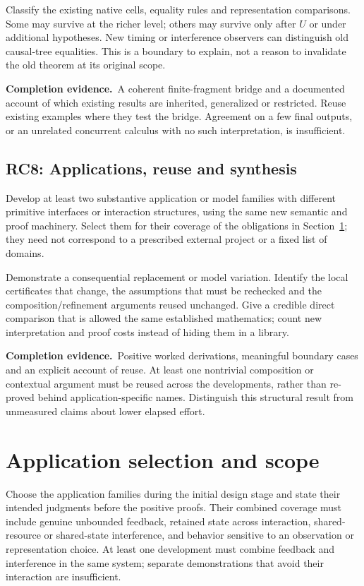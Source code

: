 \documentclass[11pt,a4paper]{article}
\newcommand{\deliver}{\par\textbf{Completion evidence.}\ }
\begin{document}
Classify the existing native cells, equality rules and representation comparisons. Some may survive at the richer level; others may survive only after \(U\) or under additional hypotheses. New timing or interference observers can distinguish old causal-tree equalities. This is a boundary to explain, not a reason to invalidate the old theorem at its original scope.

\deliver A coherent finite-fragment bridge and a documented account of which existing results are inherited, generalized or restricted. Reuse existing examples where they test the bridge. Agreement on a few final outputs, or an unrelated concurrent calculus with no such interpretation, is insufficient.

\subsection*{RC8: Applications, reuse and synthesis}\label{rc8}
Develop at least two substantive application or model families with different primitive interfaces or interaction structures, using the same new semantic and proof machinery. Select them for their coverage of the obligations in Section~\ref{sec:applications}; they need not correspond to a prescribed external project or a fixed list of domains.

Demonstrate a consequential replacement or model variation. Identify the local certificates that change, the assumptions that must be rechecked and the composition/refinement arguments reused unchanged. Give a credible direct comparison that is allowed the same established mathematics; count new interpretation and proof costs instead of hiding them in a library.

\deliver Positive worked derivations, meaningful boundary cases and an explicit account of reuse. At least one nontrivial composition or contextual argument must be reused across the developments, rather than re-proved behind application-specific names. Distinguish this structural result from unmeasured claims about lower elapsed effort.

\section{Application selection and scope}\label{sec:applications}

Choose the application families during the initial design stage and state their intended judgments before the positive proofs. Their combined coverage must include genuine unbounded feedback, retained state across interaction, shared-resource or shared-state interference, and behavior sensitive to an observation or representation choice. At least one development must combine feedback and interference in the same system; separate demonstrations that avoid their interaction are insufficient.
\end{document}
